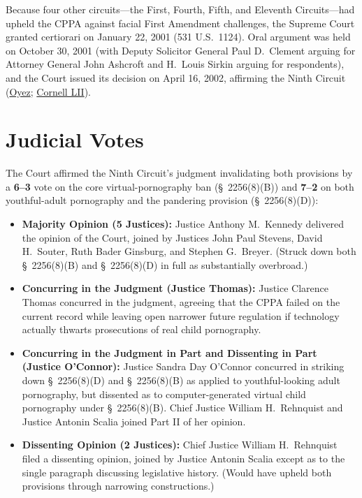 \documentclass[12pt]{article}
\begin{document}
Because four other circuits---the First, Fourth, Fifth, and Eleventh Circuits---had upheld the CPPA against facial First Amendment challenges, the Supreme Court granted certiorari on January 22, 2001 (531 U.S.\ 1124). Oral argument was held on October 30, 2001 (with Deputy Solicitor General Paul D.\ Clement arguing for Attorney General John Ashcroft and H.\ Louis Sirkin arguing for respondents), and the Court issued its decision on April 16, 2002, affirming the Ninth Circuit (\href{https://www.oyez.org/cases/2001/00-795}{Oyez}; \href{https://www.law.cornell.edu/supct/html/00-795.ZS.html}{Cornell LII}).

\section{Judicial Votes}

The Court affirmed the Ninth Circuit's judgment invalidating both provisions by a \textbf{6--3} vote on the core virtual-pornography ban (\S~2256(8)(B)) and \textbf{7--2} on both youthful-adult pornography and the pandering provision (\S~2256(8)(D)):

\begin{itemize}
\item \textbf{Majority Opinion (5 Justices):} Justice Anthony M.\ Kennedy delivered the opinion of the Court, joined by Justices John Paul Stevens, David H.\ Souter, Ruth Bader Ginsburg, and Stephen G.\ Breyer. (Struck down both \S~2256(8)(B) and \S~2256(8)(D) in full as substantially overbroad.)
\item \textbf{Concurring in the Judgment (Justice Thomas):} Justice Clarence Thomas concurred in the judgment, agreeing that the CPPA failed on the current record while leaving open narrower future regulation if technology actually thwarts prosecutions of real child pornography.
\item \textbf{Concurring in the Judgment in Part and Dissenting in Part (Justice O'Connor):} Justice Sandra Day O'Connor concurred in striking down \S~2256(8)(D) and \S~2256(8)(B) as applied to youthful-looking adult pornography, but dissented as to computer-generated virtual child pornography under \S~2256(8)(B). Chief Justice William H.\ Rehnquist and Justice Antonin Scalia joined Part II of her opinion.
\item \textbf{Dissenting Opinion (2 Justices):} Chief Justice William H.\ Rehnquist filed a dissenting opinion, joined by Justice Antonin Scalia except as to the single paragraph discussing legislative history. (Would have upheld both provisions through narrowing constructions.)
\end{itemize}
\end{document}

